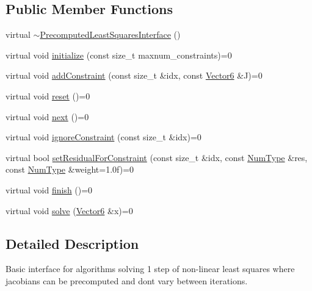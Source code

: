\subsection*{Public Member Functions}
\begin{DoxyCompactItemize}
\item 
virtual \mbox{\hyperlink{classdvo_1_1core_1_1_precomputed_least_squares_interface_ac9662bd4fa39b8acc2df291c7618953c}{$\sim$\+Precomputed\+Least\+Squares\+Interface}} ()
\item 
virtual void \mbox{\hyperlink{classdvo_1_1core_1_1_precomputed_least_squares_interface_abfd7276b663ea0afda8358a2ec9c96fe}{initialize}} (const size\+\_\+t maxnum\+\_\+constraints)=0
\item 
virtual void \mbox{\hyperlink{classdvo_1_1core_1_1_precomputed_least_squares_interface_a216ce9b1040fe23557e7ef22d4369dad}{add\+Constraint}} (const size\+\_\+t \&idx, const \mbox{\hyperlink{namespacedvo_1_1core_a05327f3312d32a301bce9fccda9e5807}{Vector6}} \&J)=0
\item 
virtual void \mbox{\hyperlink{classdvo_1_1core_1_1_precomputed_least_squares_interface_ae4b138a17c7959e780a0e30e935596e8}{reset}} ()=0
\item 
virtual void \mbox{\hyperlink{classdvo_1_1core_1_1_precomputed_least_squares_interface_a0ba3c8b938301387103912a9609a68dc}{next}} ()=0
\item 
virtual void \mbox{\hyperlink{classdvo_1_1core_1_1_precomputed_least_squares_interface_a9b879b6600b82a8b989770bf27dad7bc}{ignore\+Constraint}} (const size\+\_\+t \&idx)=0
\item 
virtual bool \mbox{\hyperlink{classdvo_1_1core_1_1_precomputed_least_squares_interface_a55870a4fa167484edf3e9b8120ad3232}{set\+Residual\+For\+Constraint}} (const size\+\_\+t \&idx, const \mbox{\hyperlink{namespacedvo_1_1core_ab9c199d221775a923e2549ad7e15c323}{Num\+Type}} \&res, const \mbox{\hyperlink{namespacedvo_1_1core_ab9c199d221775a923e2549ad7e15c323}{Num\+Type}} \&weight=1.\+0f)=0
\item 
virtual void \mbox{\hyperlink{classdvo_1_1core_1_1_precomputed_least_squares_interface_a6b811d85e3fe6a8a054b639171f9b353}{finish}} ()=0
\item 
virtual void \mbox{\hyperlink{classdvo_1_1core_1_1_precomputed_least_squares_interface_a036a293d0a53a7b019f8942776fb5d29}{solve}} (\mbox{\hyperlink{namespacedvo_1_1core_a05327f3312d32a301bce9fccda9e5807}{Vector6}} \&x)=0
\end{DoxyCompactItemize}


\subsection{Detailed Description}
Basic interface for algorithms solving 1 step of non-\/linear least squares where jacobians can be precomputed and don\textquotesingle{}t vary between iterations. 

